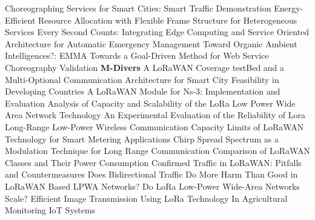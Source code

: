  \cite{chen_choreographing_2017} Choreographing {{Services}} for {{Smart Cities}}: {{Smart Traffic Demonstration}} \newline 
 \cite{sui_energyefficient_2019} Energy-{{Efficient Resource Allocation}} with {{Flexible Frame Structure}} for {{Heterogeneous Services}} \newline 
 \cite{chen_every_2018} Every {{Second Counts}}: {{Integrating Edge Computing}} and {{Service Oriented Architecture}} for {{Automatic Emergency Management}} \newline 
 \cite{duhart_organic_2017} Toward Organic Ambient Intelligences?: {{EMMA}} \newline 
 \cite{parsa_goaldriven_2016} Towards a Goal-Driven Method for Web Service Choreography Validation \newline 
\textbf{M-Divers} \newline  \cite{barro_lorawan_2019} A {{LoRaWAN}} Coverage {{testBed}} and a Multi-Optional Communication Architecture for Smart City Feasibility in Developing Countries \newline 
 \cite{reynders_lorawan_2018} A {{LoRaWAN}} Module for Ns-3: Implementation and Evaluation \newline 
 \cite{mikhaylov_analysis_2016} Analysis of {{Capacity}} and {{Scalability}} of the {{LoRa Low Power Wide Area Network Technology}} \newline 
 \cite{cattani_experimental_2017} An Experimental Evaluation of the Reliability of Lora Long-Range Low-Power Wireless Communication \newline 
 \cite{varsier_capacity_2017} Capacity Limits of {{LoRaWAN}} Technology for Smart Metering Applications \newline 
 \cite{reynders_chirp_2016} Chirp Spread Spectrum as a Modulation Technique for Long Range Communication \newline 
 \cite{cheong_comparison_2017} Comparison of {{LoRaWAN}} Classes and Their Power Consumption \newline 
 \cite{capuzzo_confirmed_2018} Confirmed Traffic in {{LoRaWAN}}: {{Pitfalls}} and Countermeasures \newline 
 \cite{pop_does_2017} Does {{Bidirectional Traffic Do More Harm Than Good}} in {{LoRaWAN Based LPWA Networks}}? \newline 
 \cite{bor_lora_2016} Do {{LoRa Low}}-{{Power Wide}}-{{Area Networks Scale}}? \newline 
 \cite{chen_efficient_2019} Efficient {{Image Transmission Using LoRa Technology In Agricultural Monitoring IoT Systems}} \newline 
